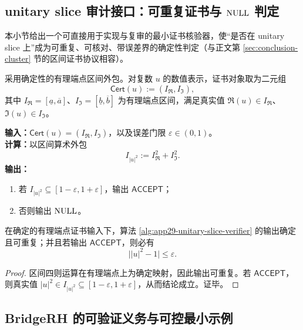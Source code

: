 \subsection{unitary slice 审计接口：可重复证书与 $\mathrm{NULL}$ 判定}\label{subsec:app29-unitary-cert}

本小节给出一个可直接用于实现与复审的最小证书核验器，使“是否在 unitary slice 上”成为可重复、可核对、带误差界的确定性判定（与正文第 \ref{sec:conclusion-cluster} 节的区间证书协议相容）。

\begin{definition}[区间证书对象]\label{def:app29-cert-interval}
采用确定性的有理端点区间外包。对复数 $u$ 的数值表示，证书对象取为二元组
$$
\mathsf{Cert}(u):=(I_{\Re},I_{\Im}),
$$
其中 $I_{\Re}=[\underline a,\overline a]$、$I_{\Im}=[\underline b,\overline b]$ 为有理端点区间，满足真实值 $\Re(u)\in I_{\Re}$、$\Im(u)\in I_{\Im}$。
\end{definition}

\begin{algorithm}\label{alg:app29-unitary-slice-verifier}
\textbf{输入：}$\mathsf{Cert}(u)=(I_{\Re},I_{\Im})$，以及误差门限 $\varepsilon\in(0,1)$。\\
\textbf{计算：}以区间算术外包
$$
I_{|u|^2}:=I_{\Re}^2+I_{\Im}^2.
$$
\textbf{输出：}
\begin{enumerate}
  \item 若 $I_{|u|^2}\subseteq [1-\varepsilon,1+\varepsilon]$，输出 $\mathsf{ACCEPT}$；
  \item 否则输出 $\mathrm{NULL}$。
\end{enumerate}
\end{algorithm}

\begin{theorem}[可重复性与一侧可靠性]\label{thm:app29-unitary-slice-sound}
在确定的有理端点证书输入下，算法 \ref{alg:app29-unitary-slice-verifier} 的输出确定且可重复；并且若输出 $\mathsf{ACCEPT}$，则必有
$$
\bigl||u|^2-1\bigr|\le \varepsilon.
$$
\end{theorem}

\begin{proof}
区间四则运算在有理端点上为确定映射，因此输出可重复。若 $\mathsf{ACCEPT}$，则真实值 $|u|^2\in I_{|u|^2}\subseteq[1-\varepsilon,1+\varepsilon]$，从而结论成立。证毕。
\end{proof}

\subsection{BridgeRH 的可验证义务与可控最小示例}\label{subsec:app29-bridge-min}

